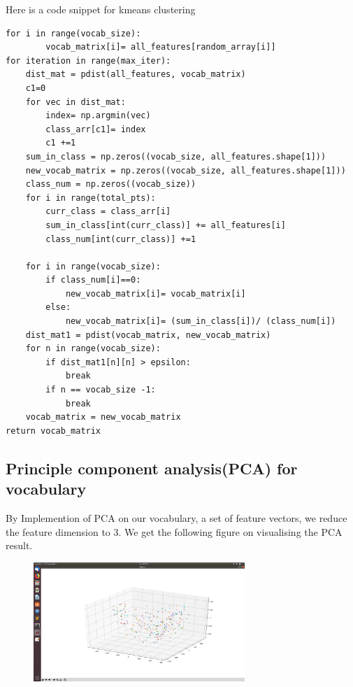 Here is a code snippet for kmeans clustering

    



\vspace{10pt}
\begin{lstlisting}[style=Matlab-editor]
for i in range(vocab_size):
        vocab_matrix[i]= all_features[random_array[i]]
for iteration in range(max_iter):
    dist_mat = pdist(all_features, vocab_matrix)
    c1=0
    for vec in dist_mat:
        index= np.argmin(vec)
        class_arr[c1]= index
        c1 +=1
    sum_in_class = np.zeros((vocab_size, all_features.shape[1]))
    new_vocab_matrix = np.zeros((vocab_size, all_features.shape[1]))
    class_num = np.zeros((vocab_size))
    for i in range(total_pts):
        curr_class = class_arr[i]
        sum_in_class[int(curr_class)] += all_features[i]
        class_num[int(curr_class)] +=1

    for i in range(vocab_size):
        if class_num[i]==0:
            new_vocab_matrix[i]= vocab_matrix[i]
        else:
            new_vocab_matrix[i]= (sum_in_class[i])/ (class_num[i])
    dist_mat1 = pdist(vocab_matrix, new_vocab_matrix)
    for n in range(vocab_size):
        if dist_mat1[n][n] > epsilon:
            break
        if n == vocab_size -1:
            break
    vocab_matrix = new_vocab_matrix
return vocab_matrix

\end{lstlisting}
\subsection*{Principle component analysis(PCA) for vocabulary}
\vspace{-5pt}
By Implemention of PCA on our vocabulary, a set of feature vectors, we reduce the feature dimension to 3. We get the following figure on visualising the PCA result.
 \begin{figure}[h]
    \centering
    \includegraphics[width=8cm]{img.png}
    \end{figure}

